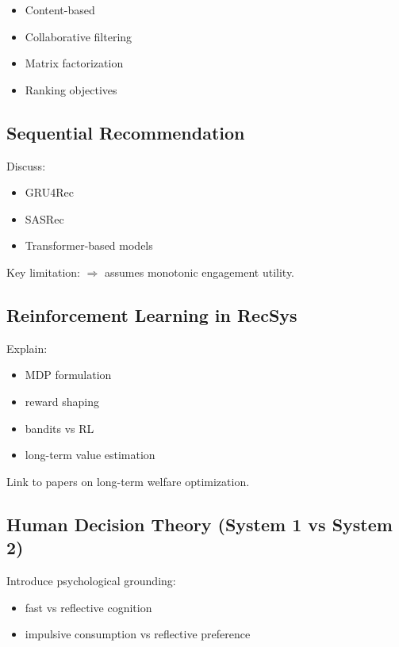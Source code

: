 \documentclass[lettersize,journal]{IEEEtran}
\begin{document}
\begin{itemize}
    \item Content-based
    \item Collaborative filtering
    \item Matrix factorization
    \item Ranking objectives
\end{itemize}

\subsection{Sequential Recommendation}

Discuss:

\begin{itemize}
    \item GRU4Rec
    \item SASRec
    \item Transformer-based models
\end{itemize}

Key limitation:
$\Rightarrow$ assumes monotonic engagement utility.

\subsection{Reinforcement Learning in RecSys}

Explain:

\begin{itemize}
    \item MDP formulation
    \item reward shaping
    \item bandits vs RL
    \item long-term value estimation
\end{itemize}

Link to papers on long-term welfare optimization.

\subsection{Human Decision Theory (System 1 vs System 2)}

Introduce psychological grounding:

\begin{itemize}
    \item fast vs reflective cognition
    \item impulsive consumption vs reflective preference
\end{itemize}
\end{document}
